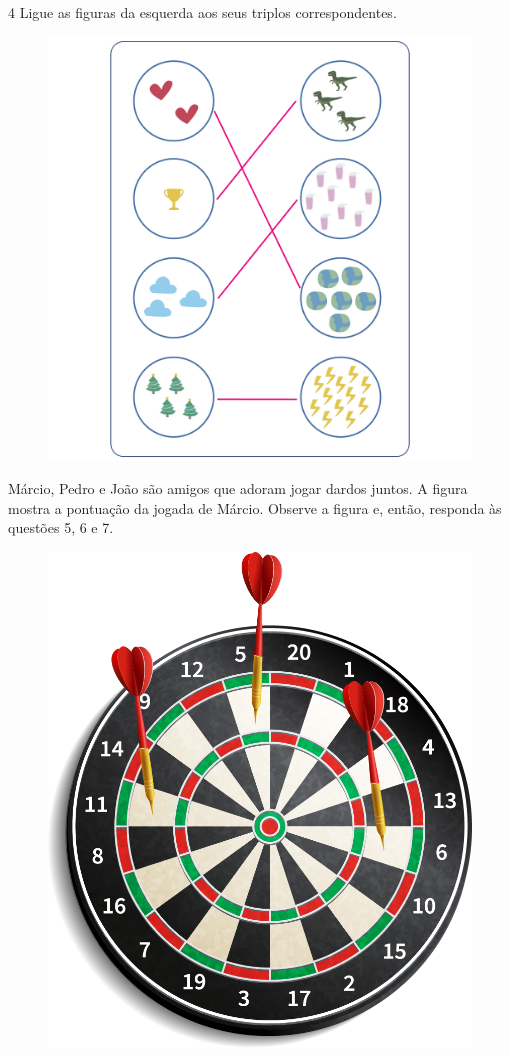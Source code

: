 \pagebreak
\num{4} Ligue as figuras da esquerda aos seus triplos correspondentes.

\begin{figure}[htpb!]
\includegraphics[width=\textwidth]{./media/image107_prof.png}
\end{figure}

\pagebreak
Márcio, Pedro e João são amigos que adoram jogar dardos juntos. A figura mostra a pontuação da jogada de Márcio. Observe a figura e, então, responda às questões 5, 6 e 7.

\begin{figure}[htpb!]
\centering
\includegraphics[width=.5\textwidth]{./media/image108.png}
\end{figure}

